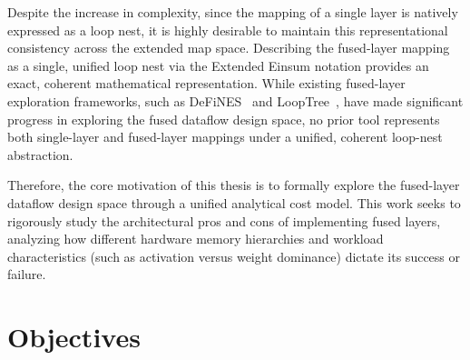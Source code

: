 Despite the increase in complexity, since the mapping of a single layer is natively expressed as a loop nest, it is highly desirable to maintain this representational consistency across the extended map space. Describing the fused-layer mapping as a single, unified loop nest via the Extended Einsum notation provides an exact, coherent mathematical representation. While existing fused-layer exploration frameworks, such as DeFiNES~\cite{mei2023defines} and LoopTree~\cite{gilbert2024looptree}, have made significant progress in exploring the fused dataflow design space, no prior tool represents both single-layer and fused-layer mappings under a unified, coherent loop-nest abstraction.

Therefore, the core motivation of this thesis is to formally explore the fused-layer dataflow design space through a unified analytical cost model. This work seeks to rigorously study the architectural pros and cons of implementing fused layers, analyzing how different hardware memory hierarchies and workload characteristics (such as activation versus weight dominance) dictate its success or failure.

\section{Objectives}
\label{sec:intro-objectives}

